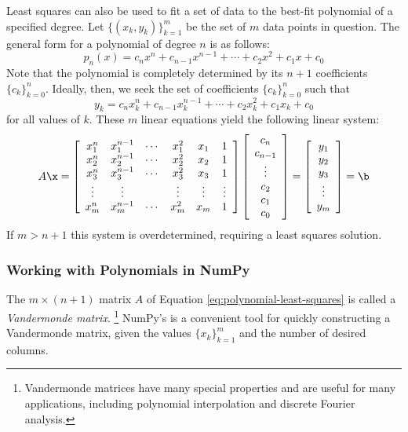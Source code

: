 Least squares can also be used to fit a set of data to the best-fit polynomial of a specified degree.
Let $\{(x_k, y_k)\}_{k=1}^m$ be the set of $m$ data points in question.
The general form for a polynomial of degree $n$ is as follows:
\[
p_n(x) = c_n x^n + c_{n-1} x^{n-1} + \cdots + c_2 x^2 + c_1 x + c_0
\]
Note that the polynomial is completely determined by its $n+1$ coefficients $\{c_k\}_{k=0}^n$.
Ideally, then, we seek the set of coefficients $\{c_k\}_{k=0}^n$ such that
\[
y_k = c_n x_k^n + c_{n-1} x_k^{n-1} + \cdots + c_2 x_k^2 + c_1 x_k + c_0
\]
for all values of $k$.
These $m$ linear equations yield the following linear system:
\begin{equation}
A\x =
\left[\begin{array}{cccccc}
x_1^n & x_1^{n-1} & \cdots & x_1^2 & x_1 & 1 \\
x_2^n & x_2^{n-1} & \cdots & x_2^2 & x_2 & 1 \\
x_3^n & x_3^{n-1} & \cdots & x_3^2 & x_3 & 1 \\
\vdots & \vdots & & \vdots & \vdots & \vdots \\
x_m^n & x_m^{n-1} & \cdots & x_m^2 & x_m & 1 \\
\end{array}\right]
\left[\begin{array}{c}
c_n \\ c_{n-1} \\ \vdots \\ c_2 \\ c_1 \\ c_0
\end{array}\right]
=
\left[\begin{array}{c} y_1 \\ y_2 \\ y_3 \\ \vdots \\ y_m \end{array}\right]
= \b
\label{eq:polynomial-least-squares}
\end{equation}
%
If $m > n+1$ this system is overdetermined, requiring a least squares solution.

\subsubsection*{Working with Polynomials in NumPy} %

The $m \times (n+1)$ matrix $A$ of Equation \ref{eq:polynomial-least-squares} is called a \emph{Vandermonde matrix}.%
\footnote{Vandermonde matrices have many special properties and are useful for many applications, including polynomial interpolation and discrete Fourier analysis.}
NumPy's  is a convenient tool for quickly constructing a Vandermonde matrix, given the values $\{x_k\}_{k=1}^m$ and the number of desired columns.

